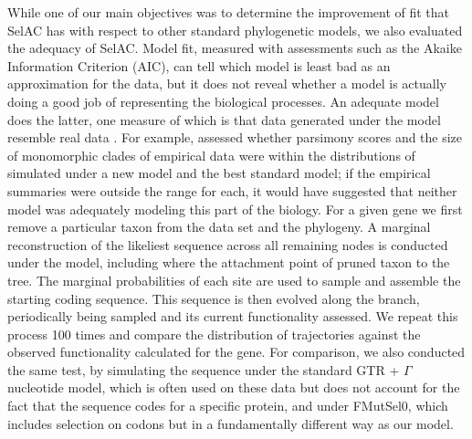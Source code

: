 \documentclass[12pt,letterpaper]{article}
\newcommand{\selac}{SelAC\xspace}
\begin{document}
While one of our main objectives was to determine the improvement of fit that \selac has with respect to other standard phylogenetic models, we also evaluated the adequacy of \selac.
Model fit, measured with assessments such as the Akaike Information Criterion (AIC), can tell which model is least bad as an approximation for the data, but it does not reveal whether a model is actually doing a good job of representing the biological processes.
An adequate model does the latter, one measure of which is that data generated under the model resemble real data \citep{goldman1993statistical}.
For example, \citet{BeaulieuEtAl2013} assessed whether parsimony scores and the size of monomorphic clades of empirical data were within the distributions of simulated under a new model and the best standard model; if the empirical summaries were outside the range for each, it would have suggested that neither model was adequately modeling this part of the biology.
For a given gene we first remove a particular taxon from the data set and the phylogeny.
A marginal reconstruction of the likeliest sequence across all remaining nodes is conducted under the model, including where the attachment point of pruned taxon to the tree.
The marginal probabilities of each site are used to sample and assemble the starting coding sequence.
This sequence is then evolved along the branch, periodically being sampled and its current functionality assessed.
We repeat this process 100 times and compare the distribution of trajectories against the observed functionality calculated for the gene.
For comparison, we also conducted the same test, by simulating the sequence under the standard GTR + $\Gamma$ nucleotide model, which is often used on these data but does not account for the fact that the sequence codes for a specific protein, and under FMutSel0, which includes selection on codons but in a fundamentally different way as our model.
\end{document}
